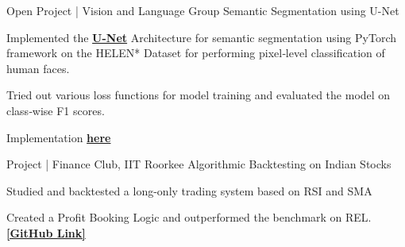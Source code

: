 \begin{cventries}
\cventry
{Open Project | Vision and Language Group} %
{Semantic Segmentation using U-Net} %
{} %
{} %
{
	\begin{cvitems} %
		\item {Implemented the \href{https://arxiv.org/pdf/1505.04597.pdf}{\bf U-Net} Architecture for semantic segmentation using PyTorch framework on the HELEN* Dataset for performing pixel‑level classification of human faces.}
	 	\item {Tried out various loss functions for model training and evaluated the model on class‑wise F1 scores.}
	 	\item Implementation \href{https://github.com/ChanBong/unet_semantic_segmentation}{\bf here}
	\end{cvitems}
}

\cventry
{Project | Finance Club, IIT Roorkee} %
{Algorithmic Backtesting on Indian Stocks} %
{} %
{} %
{
	\begin{cvitems} %
		\item {Studied and backtested a long-only trading system based on RSI and SMA}
		\item {Created a Profit Booking Logic and outperformed the benchmark on REL. {\href{https://github.com/ChanBong/finance_projects}{\bf [GitHub Link]}}}
	\end{cvitems}
}
    




\end{cventries}